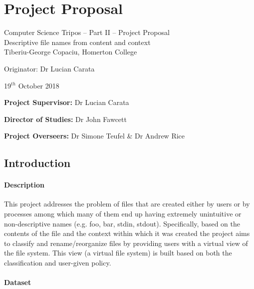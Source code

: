


\chapter{Project Proposal}
\begin{center}
  \Large
  Computer Science Tripos -- Part II -- Project Proposal\\[4mm]
  \LARGE
  Descriptive file names from content and context \\[4mm]

  \large
  Tiberiu-George Copaciu, Homerton College

  Originator: Dr Lucian Carata

  19$^{th}$ October 2018
\end{center}

\vspace{5mm}

\textbf{Project Supervisor:} Dr Lucian Carata

\textbf{Director of Studies:} Dr John Fawcett

\textbf{Project Overseers:} Dr Simone Teufel  \& Dr Andrew Rice


\section*{Introduction}

\subsubsection*{Description}

This project addresses the problem of files that are created either by users or by processes among which many of them end up having extremely unintuitive or non-descriptive names (e.g. foo, bar, stdin, stdout). Specifically, based on the contents of the file and the context within which it was created the project aims to classify and rename/reorganize files by providing users with a virtual view of the file system. This view (a virtual file system) is built based on both the classification and user-given policy.

\subsubsection*{Dataset}

